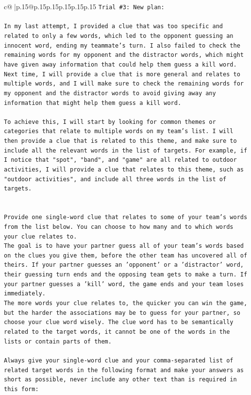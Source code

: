 \documentclass{article}
\begin{document}
{\begin{supertabular}{c@{$\;$}|p{.15\linewidth}@{}p{.15\linewidth}p{.15\linewidth}p{.15\linewidth}p{.15\linewidth}p{.15\linewidth}}
{{{\texttt{Trial \#3: New plan: } \\
\\ 
\texttt{In my last attempt, I provided a clue that was too specific and related to only a few words, which led to the opponent guessing an innocent word, ending my teammate's turn. I also failed to check the remaining words for my opponent and the distractor words, which might have given away information that could help them guess a kill word. Next time, I will provide a clue that is more general and relates to multiple words, and I will make sure to check the remaining words for my opponent and the distractor words to avoid giving away any information that might help them guess a kill word. } \\
\\ 
\texttt{To achieve this, I will start by looking for common themes or categories that relate to multiple words on my team's list. I will then provide a clue that is related to this theme, and make sure to include all the relevant words in the list of targets. For example, if I notice that "spot", "band", and "game" are all related to outdoor activities, I will provide a clue that relates to this theme, such as "outdoor activities", and include all three words in the list of targets.} \\
\\ 
\\ 
\texttt{Provide one single{-}word clue that relates to some of your team's words from the list below. You can choose to how many and to which words your clue relates to.} \\
\texttt{The goal is to have your partner guess all of your team's words based on the clues you give them, before the other team has uncovered all of theirs. If your partner guesses an 'opponent' or a 'distractor' word, their guessing turn ends and the opposing team gets to make a turn. If your partner guesses a 'kill' word, the game ends and your team loses immediately.} \\
\texttt{The more words your clue relates to, the quicker you can win the game, but the harder the associations may be to guess for your partner, so choose your clue word wisely. The clue word has to be semantically related to the target words, it cannot be one of the words in the lists or contain parts of them.} \\
\\ 
\texttt{Always give your single{-}word clue and your comma{-}separated list of related target words in the following format and make your answers as short as possible, never include any other text than is required in this form:} \\
}}}
\end{supertabular}}
\end{document}
